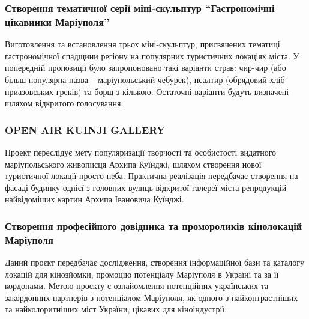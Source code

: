 
\subsubsection{Створення тематичної серії міні-скульптур \enquote{Гастрономічні цікавинки Маріуполя}}

Виготовлення та встановлення трьох міні-скульптур, присвячених тематиці
гастрономічної спадщини регіону на популярних туристичних локаціях міста. У
попередній пропозиції було запропоновано такі варіанти страв: чир-чир (або
більш популярна назва – маріупольський чебурек), псалтир (обрядовий хліб
приазовських греків) та борщ з кількою. Остаточні варіанти будуть визначені
шляхом відкритого голосування.


\subsubsection{OPEN AIR KUINJI GALLERY}

Проект переслідує мету популяризації творчості та особистості видатного
маріупольського живописця Архипа Куїнджі, шляхом створення нової туристичної
локації просто неба. Практична реалізація передбачає створення на фасаді
будинку однієї з головних вулиць відкритої галереї міста репродукцій
найвідоміших картин Архипа Івановича Куїнджі.


\subsubsection{Створення професійного довідника та промороликів кінолокацій Маріуполя}

Даний проєкт передбачає дослідження, створення інформаційної бази та каталогу
локацій для кінозйомки, промоцію потенціалу Маріуполя в Україні та за її
кордонами. Метою проєкту є ознайомлення потенційних українських та закордонних
партнерів з потенціалом Маріуполя, як одного з найконтрастніших та
найколоритніших міст України, цікавих для кіноіндустрії.


